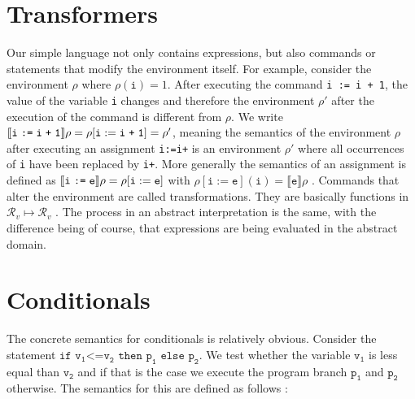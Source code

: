 \section{Transformers}

Our simple language not only contains expressions, but also commands or statements that modify the environment itself. For example, consider the environment $\rho$ where $\rho(\mathtt{i})=1$. After executing the command \texttt{i := i + 1}, the value of the variable \texttt{i} changes and therefore the environment $\rho'$ after the execution of the command is different from $\rho$. We write $\llbracket \texttt{i\;:=\;i\;+\;1} \rrbracket\rho=\rho[\mathtt{i}:=\texttt{i\;+\;1}]=\rho'$, meaning the semantics of the environment $\rho$ after executing an assignment \texttt{i\;:=\;i\;+} is an environment $\rho'$ where all occurrences of \texttt{i} have been replaced by \texttt{i\;+}. 
More generally the semantics of an assignment is defined as $\llbracket \texttt{i\;:=\;e} \rrbracket\rho=\rho[\mathtt{i}:=\texttt{e}]$ with $\rho[\mathtt{i}:=\texttt{e}](\mathtt{i})=\llbracket\mathtt{e}\rrbracket\rho$ \cite{cousot2011}. Commands that alter the environment are called transformations. They are basically functions in $\mathcal{R}_v\mapsto\mathcal{R}_v$ \cite{scott1971}.
The process in an abstract interpretation is the same, with the difference being of course, that expressions are being evaluated in the abstract domain.

\section{Conditionals}

The concrete semantics for conditionals is relatively obvious. Consider the statement $\texttt{if v}_\texttt{1}\texttt{<=v}_\texttt{2} \texttt{ then p}_\texttt{1} \texttt{ else p}_\texttt{2}$. We test whether the variable $\texttt{v}_\texttt{1}$ is less equal than $\texttt{v}_\texttt{2}$ and if that is the case we execute the program branch $\texttt{p}_\texttt{1}$ and $\texttt{p}_\texttt{2}$ otherwise. The semantics for this are defined as follows \cite{scott1971}: 

